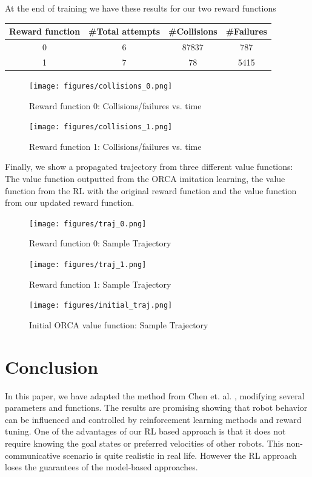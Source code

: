\documentclass[conference]{IEEEtran}
\begin{document}
At the end of training we have these results for our two reward functions 
\begin{center}
\begin{tabular}{||c c c c||} 
 \hline
 Reward function & \#Total attempts & \#Collisions  & \#Failures \\ [0.5ex] 
 \hline\hline
 0 & 6 & 87837 & 787 \\ 
 \hline
 1 & 7 & 78 & 5415 \\
 \hline
\end{tabular}
\end{center}
\begin{figure}
    \centering
    \texttt{[image: figures/collisions\_0.png]}
    \caption{Reward function 0: Collisions/failures vs. time}
    \label{fig:rew_0_coll}
\end{figure}
\begin{figure}
    \centering
    \texttt{[image: figures/collisions\_1.png]}
    \caption{Reward function 1: Collisions/failures vs. time}
    \label{fig:rew_1_coll}
\end{figure}

Finally, we show a propagated trajectory from three different value functions: The value function outputted from the ORCA imitation learning, the value function from the RL with the original reward function and the value function from our updated reward function. 

\begin{figure}
    \centering
    \texttt{[image: figures/traj\_0.png]}
    \caption{Reward function 0: Sample Trajectory}
    \label{fig:rew_0_traj}
\end{figure}
\begin{figure}
    \centering
    \texttt{[image: figures/traj\_1.png]}
    \caption{Reward function 1: Sample Trajectory}
    \label{fig:rew_1_traj}
\end{figure}
\begin{figure}
    \centering
    \texttt{[image: figures/initial\_traj.png]}
    \caption{Initial ORCA value function: Sample Trajectory}
    \label{fig:initial_traj}
\end{figure}
\section{Conclusion}
In this paper, we have adapted the method from Chen et. al. \cite{chen2017cadrl}, modifying several parameters and functions. The results are promising showing that robot behavior can be influenced and controlled by reinforcement learning methods and reward tuning. One of the advantages of our RL based approach is that it does not require knowing the goal states or preferred velocities of other robots. This non-communicative scenario is quite realistic in real life. However the RL approach loses the guarantees of the model-based approaches. 
\end{document}
